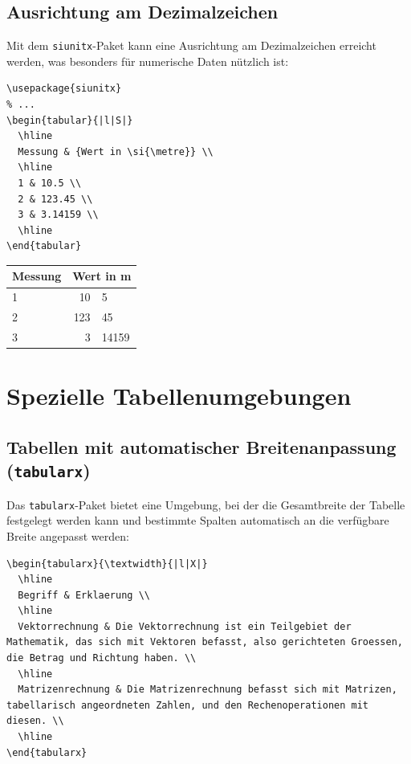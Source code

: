 \documentclass[12pt,a4paper]{article}
\begin{document}
\subsection{Ausrichtung am Dezimalzeichen}

Mit dem \texttt{siunitx}-Paket kann eine Ausrichtung am Dezimalzeichen erreicht werden, was besonders für numerische Daten nützlich ist:

\begin{lstlisting}[style=latex]
\usepackage{siunitx}
% ...
\begin{tabular}{|l|S|}
  \hline
  Messung & {Wert in \si{\metre}} \\
  \hline
  1 & 10.5 \\
  2 & 123.45 \\
  3 & 3.14159 \\
  \hline
\end{tabular}
\end{lstlisting}

\begin{ausgabe}
\begin{center}
\begin{tabular}{|l|r@{.}l|}
  \hline
  Messung & \multicolumn{2}{c|}{Wert in m} \\
  \hline
  1 & 10&5 \\
  2 & 123&45 \\
  3 & 3&14159 \\
  \hline
\end{tabular}
\end{center}
\end{ausgabe}

\section{Spezielle Tabellenumgebungen}

\subsection{Tabellen mit automatischer Breitenanpassung (\texttt{tabularx})}

Das \texttt{tabularx}-Paket bietet eine Umgebung, bei der die Gesamtbreite der Tabelle festgelegt werden kann und bestimmte Spalten automatisch an die verfügbare Breite angepasst werden:

\begin{lstlisting}[style=latex]
\begin{tabularx}{\textwidth}{|l|X|}
  \hline
  Begriff & Erklaerung \\
  \hline
  Vektorrechnung & Die Vektorrechnung ist ein Teilgebiet der Mathematik, das sich mit Vektoren befasst, also gerichteten Groessen, die Betrag und Richtung haben. \\
  \hline
  Matrizenrechnung & Die Matrizenrechnung befasst sich mit Matrizen, tabellarisch angeordneten Zahlen, und den Rechenoperationen mit diesen. \\
  \hline
\end{tabularx}
\end{lstlisting}
\end{document}

